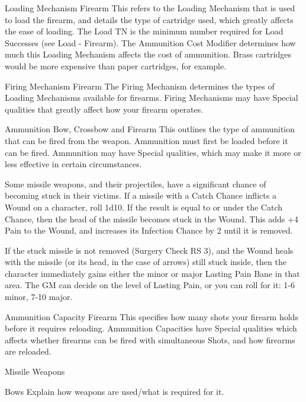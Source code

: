 \documentclass[oneside,11pt,english]{book}
\begin{document}
 

Loading Mechanism 
Firearm 
This refers to the Loading Mechanism that is used to load the firearm, and details the type of cartridge 
used, which greatly affects the ease of loading. The Load TN is the minimum number required for Load 
Successes (see Load - Firearm). The Ammunition Cost Modifier determines how much this Loading 
Mechanism affects the cost of ammunition. Brass cartridges would be more expensive than paper 
cartridges, for example. 
 


Firing Mechanism 
Firearm 
The Firing Mechanism determines the types of Loading Mechanisms available for firearms. Firing 
Mechanisms may have Special qualities that greatly affect how your firearm operates. 
 
Ammunition 
Bow, Crossbow and Firearm 
This outlines the type of ammunition that can be fired from the weapon. Ammunition must first be loaded 
before it can be fired. Ammunition may have Special qualities, which may make it more or less effective 
in certain circumstances. 

 

Some missile weapons, and their projectiles, have a significant chance of becoming stuck in their victims. 
If a missile with a Catch Chance inflicts a Wound on a character, roll 1d10. If the result is equal to or 
under the Catch Chance, then the head of the missile becomes stuck in the Wound. This adds +4 Pain to 
the Wound, and increases its Infection Chance by 2 until it is removed. 

 

If the stuck missile is not removed (Surgery Check RS 3), and the Wound heals with the missile (or its 
head, in the case of arrows) still stuck inside, then the character immediately gains either the minor or 
major Lasting Pain Bane in that area. The GM can decide on the level of Lasting Pain, or you can roll for 
it: 1-6 minor, 7-10 major. 

 

Ammunition Capacity 
Firearm 
This specifies how many shots your firearm holds before it requires reloading. Ammunition Capacities 
have Special qualities which affects whether firearms can be fired with simultaneous Shots, and how 
firearms are reloaded. 

 

Missile Weapons 

 

Bows 
Explain how weapons are used/what is required for it. 
\end{document}
